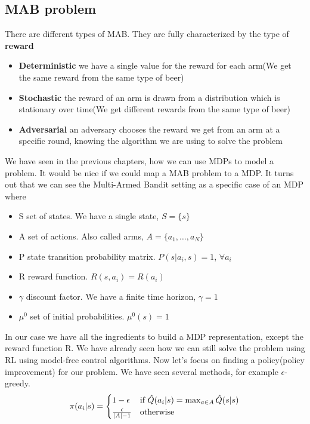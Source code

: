 \documentclass[../main.tex]{subfiles}
\begin{document}
\subsection{MAB problem}
There are different types of MAB. They are fully characterized by the type of \textbf{reward}
\begin{itemize}
    \item \textbf{Deterministic} we have a single value for the reward for each arm(We get the same reward from the same type of beer)
    \item \textbf{Stochastic} the reward of an arm is drawn from a distribution which is
          stationary over time(We get different rewards from the same type of beer)
    \item \textbf{Adversarial} an adversary chooses the reward we get from an arm at a
          specific round, knowing the algorithm we are using to solve the problem
\end{itemize}
We have seen in the previous chapters, how we can use MDPs to model a problem. It would be nice if we could map a MAB problem to a MDP. It turns out that we can see the Multi-Armed Bandit setting as a specific case of an MDP where
\begin{itemize}
    \item S set of states. We have a single state, $S=\{s\}$
    \item A set of actions. Also called arms, $A=\{a_1,\dots,a_N\}$
    \item P state transition probability matrix. $P(s|a_i,s)=1$, $\forall a_i$
    \item R reward function. $R(s,a_i)=R(a_i)$
    \item $\gamma$ discount factor. We have a finite time horizon, $\gamma=1$
    \item $\mu^0$ set of initial probabilities. $\mu^0(s)=1$
\end{itemize}
In our case we have all the ingredients to build a MDP representation, except the reward function R. We have already seen how we can still solve the problem using RL using model-free control algorithms. Now let's focus on finding a policy(policy improvement) for our problem. We have seen several methods, for example $\epsilon$-greedy.
\begin{equation}
    \pi(a_i|s)=
    \begin{cases}
        1-\epsilon             & \text{if }\Hat{Q}(a_i|s) = \max_{a \in A}\Hat{Q}(s|s) \\
        \frac{\epsilon}{|A|-1} & \text{otherwise}
    \end{cases}
\end{equation}
\end{document}
